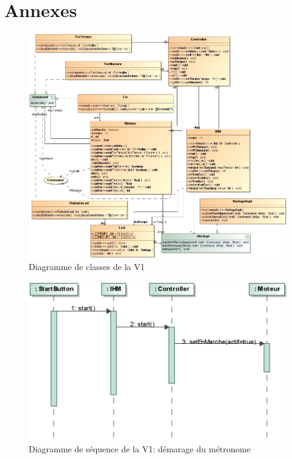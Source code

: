 \documentclass{article}
\begin{document}
\newpage
\section*{Annexes}
\begin{figure}[h]
   \caption{Diagramme de classes de la V1}
   \includegraphics[scale=0.75]{class_diagram_v1}
\end{figure}
\begin{figure}[h]
   \caption{Diagramme de séquence de la V1: démarage du métronome}
   \includegraphics[scale=0.55]{seq_diagram_v1}
\end{figure}
\end{document}
